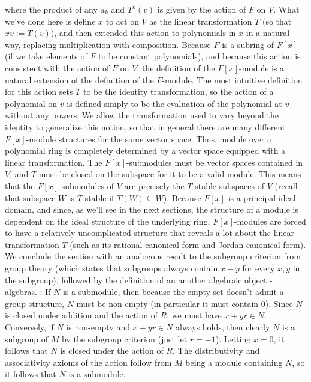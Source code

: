 \documentclass{article}
\begin{document}
where the product of any $ a_k $ and $ T^k(v) $ is given by the action of $ F $ on $ V $. What we've done here is define $ x $ to act on $ V $ as the linear transformation $ T $ (so that $ x v := T(v) $), and then extended this action to polynomials in $ x $ in a natural way, replacing multiplication with composition. Because $ F $ is a subring of $ F[x] $ (if we take elements of $ F $ to be constant polynomials), and because this action is consistent with the action of $ F $ on $ V $, the definition of the $ F[x] $-module is a natural extension of the definition of the $ F $-module. The most intuitive definition for this action sets $ T $ to be the identity transformation, so the action of a polynomial on $ v $ is defined simply to be the evaluation of the polynomial at $ v $ without any powers. We allow the transformation used to vary beyond the identity to generalize this notion, so that in general there are many different $ F[x] $-module structures for the same vector space. Thus, module over a polynomial ring is completely determined by a vector space equipped with a linear transformation. The $ F[x] $-submodules must be vector spaces contained in $ V $, and $ T $ must be closed on the subspace for it to be a valid module. This means that the $ F[x] $-submodules of $ V $ are precisely the $ T $-stable subspaces of $ V $ (recall that subspace $ W $ is $ T $-stable if $ T(W) \subseteq W $). Because $ F[x] $ is a principal ideal domain, and since, as we'll see in the next sections, the structure of a module is dependent on the ideal structure of the underlying ring, $ F[x] $-modules are forced to have a relatively uncomplicated structure that reveals a lot about the linear transformation $ T $ (such as its rational canonical form and Jordan canonical form).
\nn
We conclude the section with an analogous result to the subgroup criterion from group theory (which states that subgroups always contain $ x - y $ for every $ x, y $ in the subgroup), followed by the definition of an another algebraic object - algebras.
\nn
{}: 
\n
\Pf If $ N $ is a submodule, then because the empty set doesn't admit a group structure, $ N $ must be non-empty (in particular it must contain $ 0 $). Since $ N $ is closed under addition and the action of $ R $, we must have $ x + y r \in N $. Conversely, if $ N $ is non-empty and $ x + y r \in N $ always holds, then clearly $ N $ is a subgroup of $ M $ by the subgroup criterion (just let $ r = -1 $). Letting $ x = 0 $, it follows that $ N $ is closed under the action of $ R $. The distributivity and associativity axioms of the action follow from $ M $ being a module containing $ N $, so it follows that $ N $ is a submodule. \qedsymbol
\end{document}
